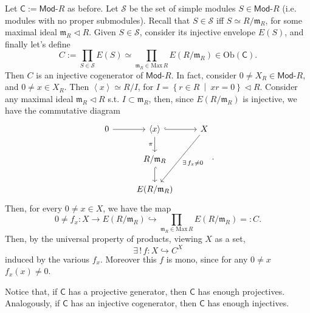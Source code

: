 \begin{ex}
	Let $\mathsf{C}:= \mathsf{Mod}\text{-}R$ as before.
	Let $\mathcal{S}$ be the set of simple modules $S \in \mathsf{Mod}\text{-}R$ (i.e. modules with no proper submodules).
	Recall that $S \in \mathcal{S}$ iff $S \simeq R/\mathfrak{m}_R$, for some maximal ideal $\mathfrak{m}_R \triangleleft R$.
	Given $S \in \mathcal{S}$, consider its injective envelope $E(S)$, and finally
	let's define
	\begin{equation}
		C := \prod_{S \in \mathcal{S}} E(S) \simeq
		\prod_{\mathfrak{m}_R \in \mathrm{Max}\, R} E \left( R / \mathfrak{m}_R \right)
		\in \mathrm{Ob} \left(\mathsf{C}\right)
	.\end{equation} 
	Then $C$ is an injective cogenerator of $\mathsf{Mod}\text{-}R$.
	In fact, consider $0 \neq X_R \in \mathsf{Mod}\text{-}R$, and $0 \neq x \in X_R$.
	Then $\left\langle x \right\rangle \simeq R/I$, 
	for $I = \left\{ r \in R \ \middle|\ xr = 0 \right\} \triangleleft R$.
	Consider any maximal ideal $\mathfrak{m}_R \triangleleft R$ s.t. $I \subset \mathfrak{m}_R$,
	then, since $E(R/\mathfrak{m}_R)$ is injective, we have the commutative diagram
	\begin{equation}
	\begin{tikzcd}
		0 \arrow[r, "", rightarrow] &
		\left\langle x \right\rangle \arrow[r, "", hookrightarrow] \arrow[d, "\pi"', rightarrow] &
		X \arrow[ldd, "\exists\, f_x \neq 0", rightarrow] \\
		& R/\mathfrak{m}_R \arrow[d, "", hookrightarrow] & \\
		& E(R/\mathfrak{m}_R) &
	\end{tikzcd}
	.\end{equation} 
	Then, for every $0 \neq x \in X$, we have the map
	\begin{equation}
		0 \neq f_x: X \to E \left( R/\mathfrak{m}_R \right) \hookrightarrow
		\prod_{\mathfrak{m}_R \in \mathrm{Max}\, R} E \left( R / \mathfrak{m}_R \right) =: C
	.\end{equation} 
	Then, by the universal property of products, viewing $X$ as a set,
	\begin{equation}
	\exists\, !\, f: X \hookrightarrow C^X
	\end{equation} 
	induced by the various $f_x$.
	Moreover this $f$ is mono, since for any $0 \neq x$ $f_x(x) \neq 0$.
\end{ex} 

\begin{rem}
	Notice that, if $\mathsf{C}$ has a projective generator, then $\mathsf{C}$
	has enough projectives.
	Analogously, if $\mathsf{C}$ has an injective cogenerator, then $\mathsf{C}$ 
	has enough injectives.
\end{rem} 

